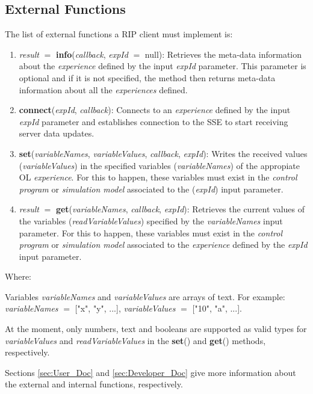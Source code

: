 \subsection{External Functions}
\label{sec:External_Functions}
The list of external functions a RIP client must implement is:

\begin{enumerate}
    \item \textit{result} $=$ \textbf{info}(\textit{callback}, \textit{expId} $=$ null): Retrieves the meta-data information about the \textit{experience} defined by the input \textit{expId} parameter. This parameter is optional and if it is not specified, the method then returns meta-data information about all the \textit{experiences} defined.
    \item \textbf{connect}(\textit{expId}, \textit{callback}): Connects to an \textit{experience} defined by the input \textit{expId} parameter and establishes connection to the SSE to start receiving server data updates.
    \item \textbf{set}(\textit{variableNames}, \textit{variableValues}, \textit{callback}, \textit{expId}): Writes the received values (\textit{variableValues}) in the specified variables (\textit{variableNames}) of the appropiate OL \textit{experience}. For this to happen, these variables must exist in the \textit{control program} or \textit{simulation model} associated to the (\textit{expId}) input parameter.
    \item \textit{result} $=$ \textbf{get}(\textit{variableNames}, \textit{callback}, \textit{expId}): Retrieves the current values of the variables (\textit{readVariableValues}) specified by the \textit{variableNames} input parameter. For this to happen, these variables must exist in the \textit{control program} or \textit{simulation model} associated to the \textit{experience} defined by the \textit{expId} input parameter.
\end{enumerate}

Where:

Variables \textit{variableNames} and \textit{variableValues} are arrays of text. For example: \textit{variableNames} $=$ ["x", "y", ...], \textit{variableValues} $=$ ["10", "a", ...].

At the moment, only numbers, text and booleans are supported as valid types for \textit{variableValues} and \textit{readVariableValues} in the \textbf{set}() and \textbf{get}() methods, respectively.

Sections \ref{sec:User_Doc} and \ref{sec:Developer_Doc} give more information about the external and internal functions, respectively.

